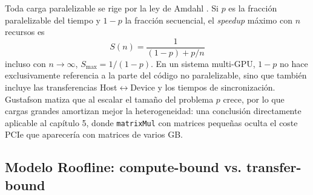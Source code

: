 Toda carga paralelizable se rige por la ley de Amdahl \cite{amdahl1967}. Si $p$ es 
la fracción paralelizable del tiempo y $1-p$ la fracción secuencial, el \textit{speedup} máximo con 
$n$ recursos es
\begin{equation}
S(n) = \frac{1}{(1-p) + p/n}
\end{equation}
incluso con $n \to \infty$, $S_{\max} = 1/(1-p)$. En un sistema multi-GPU, $1-p$ no hace exclusivamente
referencia a la parte del código no paralelizable, sino que también incluye las transferencias 
Host$\leftrightarrow$Device y los tiempos de sincronización. 
Gustafson \cite{gustafson1988} matiza que al escalar el tamaño del problema $p$ crece, por lo que 
cargas grandes amortizan mejor la heterogeneidad: una conclusión directamente aplicable al capítulo
5, donde \texttt{matrixMul} con matrices pequeñas oculta el coste PCIe que aparecería con matrices
de varios GB.

\subsection{Modelo Roofline: compute-bound vs. transfer-bound} \label{sec:roofline}

